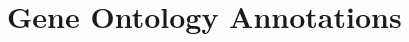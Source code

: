 \documentclass[
	fontsize=10pt, %
	twoside=false, %
	secnumdepth=1, %
  toc=indentunnumbered %
]{kaobook}
\begin{document}
\section{Gene Ontology Annotations}
\label{sec:gene-ontology-annotations}





\end{document}
